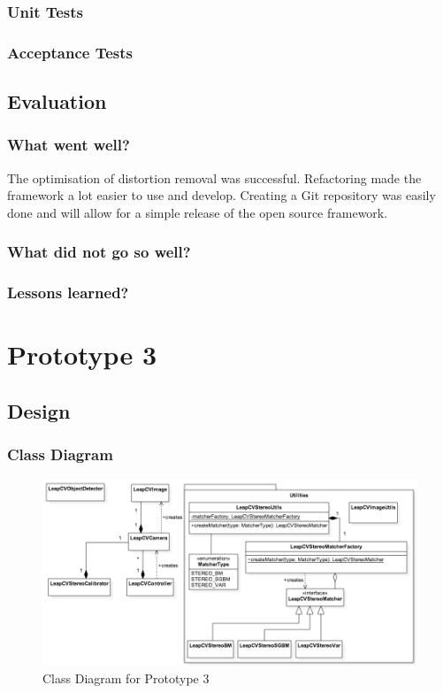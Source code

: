 \documentclass[11pt,oneside]{report}
\begin{document}
			\subsubsection{Unit Tests}
			\subsubsection{Acceptance Tests}
			
		\subsection{Evaluation}
			\subsubsection{What went well?}
			The optimisation of distortion removal was successful.
			Refactoring made the framework a lot easier to use and develop.
			Creating a Git repository was easily done and will allow for a simple release of the open source framework.
			\subsubsection{What did not go so well?}
			\subsubsection{Lessons learned?}
	\section{Prototype 3}\label{sec:p3}
		\subsection{Design}
			\subsubsection{Class Diagram}
			\begin{figure}[ht]
		\begin{center}
    			\includegraphics[width=\textwidth]{class_diagram_it_3}
    			\caption{Class Diagram for Prototype 3 \protect {\label{fig:class_diagram_it_3}}}
    		\end{center}
		\end{figure}			
\end{document}
